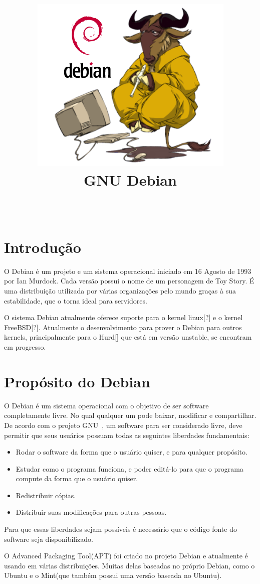 \documentclass[conference]{IEEEtran}
\title{\includegraphics[scale = 0.3]{GnuDebian.png}\\
	GNU Debian}
\author{	
\IEEEauthorblockN{Francisco Anderson Bezerra Rodrigues, Marcelo Bulhões Fonseca, Vitor Silva De Deus} \\
\IEEEauthorblockA{Departamento de Ciência da Computação, \\ Universidade de Brasília\\
}
}
\begin{document}
 

\maketitle
{}  




\section{Introdução}\label{sec:intro}
O Debian é um projeto e um sistema operacional iniciado em 16 Agosto de 1993 por Ian Murdock\cite{DebianHistory}. Cada versão possui o nome de um personagem de Toy Story. É uma distribuição utilizada por várias organizações pelo mundo\cite{DebianUsers} graças à sua estabilidade, que o torna ideal para servidores.

O sistema Debian atualmente oferece suporte para o kernel linux[?] e o kernel FreeBSD[?]. Atualmente o desenvolvimento para prover o Debian para outros kernels, principalmente para o Hurd[] que está em versão unstable, se encontram em progresso. 

\section{Propósito do Debian}\label{sec:prop}
O Debian é um sistema operacional com o objetivo de ser software completamente livre. No qual qualquer um pode baixar, modificar e compartilhar. De acordo com o projeto GNU~\cite{FreeSoftware}, um software para ser considerado livre, deve permitir que seus usuários possuam todas as seguintes liberdades fundamentais:
\begin{itemize}
	\item Rodar o software da forma que o usuário quiser, e para qualquer propósito.
	\item Estudar como o programa funciona, e poder editá-lo para que o programa compute da forma que o usuário quiser.
	\item Redistribuir cópias.
	\item Distribuir suas modificações para outras pessoas.
\end{itemize}
Para que essas liberdades sejam possíveis é necessário que o código fonte do software seja disponibilizado.

O Advanced Packaging Tool(APT) foi criado no projeto Debian e atualmente é usando em várias distribuições. Muitas delas baseadas no próprio Debian, como o Ubuntu e o Mint(que também possui uma versão baseada no Ubuntu).
\end{document}
